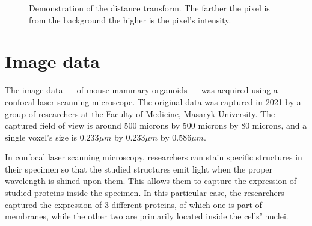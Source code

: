 \documentclass[
  digital,     %
  oneside,     %
  nosansbold,  %
  nocolorbold, %
  lof,         %
  lot,         %
]{fithesis4}
\begin{document}
\begin{figure}
\begin{subfigure}[t]{0.48\textwidth}
    \end{subfigure}
    \caption{Demonstration of the distance transform. The farther the pixel is
    from the background the higher is the pixel's intensity.}
    \label{fig:demonstration-distance-map}
\end{figure}

\chapter{Image data}

The image data --- of mouse mammary organoids --- was acquired using a confocal
laser scanning microscope. The original data was captured in 2021 by a group of
researchers at the Faculty of Medicine, Masaryk University. The captured field of view is around 500
microns by 500 microns by 80 microns, and a single voxel's size is $0.233\mu m$ by
$0.233\mu m$ by $0.586\mu m$.

In confocal laser scanning microscopy, researchers can stain specific structures in
their specimen so that the studied structures emit light when the proper wavelength
is shined upon them. This allows them to capture the expression of studied proteins
inside the specimen. In this particular case, the researchers captured the
expression of 3 different proteins, of which one is part of membranes, while the
other two are primarily located inside the cells' nuclei.
\end{document}
